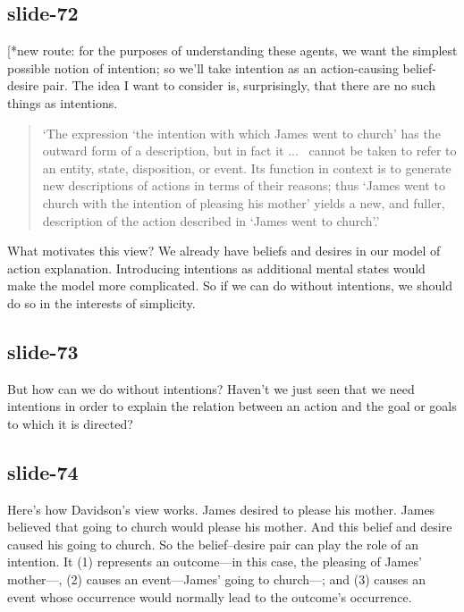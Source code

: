 \documentclass[12pt,\papersize]{extarticle}
\begin{document}
 
\subsection{slide-72}
[*new route: for the purposes of understanding these agents, we want the simplest possible notion of intention; so we'll take intention as an action-causing belief-desire pair.
The idea I want to consider is, surprisingly, that there are no such things as intentions.
\begin{quote}
`The expression `the intention with which James went to church' has the outward form of a description, but in fact it
...\ %
cannot be taken to refer to an entity, state, disposition, or event. Its function in context is to generate new descriptions of actions in terms of their reasons; thus `James went to church with the intention of pleasing his mother' yields a new, and fuller, description of the action described in `James went to church'.'
\citep[p.\ 690]{davidson:1963_orig}
\end{quote}
What motivates this view?
We already have beliefs and desires in our model of action explanation.
Introducing intentions as additional mental states would make the model more complicated.
So if we can do without intentions, we should do so in the interests of simplicity.
 
 
\subsection{slide-73}
But how can we do without intentions?
Haven't we just seen that we need intentions in order to explain the relation between an action and the goal or goals to which it is directed?
 
 
\subsection{slide-74}
Here's how Davidson's view works.
James desired to please his mother.
James believed that going to church would please his mother.
And this belief and desire caused his going to church.
So the belief--desire pair can play the role of an intention.
It (1) represents an outcome---in this case, the pleasing of James' mother---, (2) causes an event---James' going to church---; and (3) causes an event whose occurrence would normally lead to the outcome’s occurrence.
 
 
\end{document}
